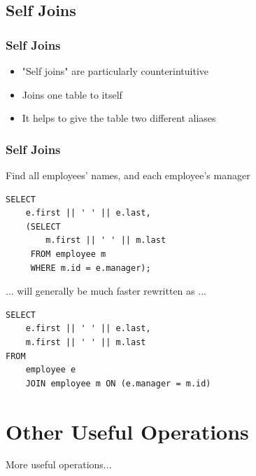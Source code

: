 \documentclass{beamer}
\begin{document}
\subsection{Self Joins}
\begin{frame}
    \frametitle{Self Joins}
    \begin{itemize}
        \item "Self joins" are particularly counterintuitive
        \item Joins one table to itself
        \item It helps to give the table two different aliases
    \end{itemize}
\end{frame}

\begin{frame}[fragile]
    \frametitle{Self Joins}
    Find all employees' names, and each employee's manager
    \begin{verbatim}
SELECT
    e.first || ' ' || e.last,
    (SELECT
        m.first || ' ' || m.last
     FROM employee m
     WHERE m.id = e.manager);
    \end{verbatim}
    ... will generally be much faster rewritten as ...
    \begin{verbatim}
SELECT
    e.first || ' ' || e.last,
    m.first || ' ' || m.last
FROM
    employee e
    JOIN employee m ON (e.manager = m.id)
    \end{verbatim}
\end{frame}

\section{Other Useful Operations}
\begin{frame}
    More useful operations...
\end{frame}
\end{document}
